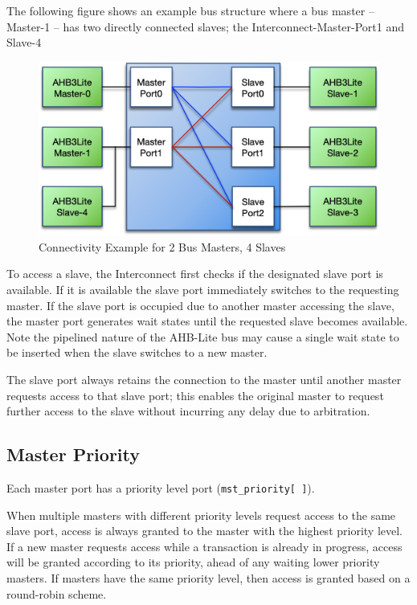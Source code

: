 The following figure shows an example bus structure where a bus master -- Master-1
-- has two directly connected slaves; the Interconnect-Master-Port1 and
Slave-4

\begin{figure}[tbh]
	\centering
	\includegraphics{assets/img/ahb-lite-switch-sys2}
	\caption{Connectivity Example for 2 Bus Masters, 4 Slaves}
	\label{fig:ahb-lite-switch-sys2}
\end{figure}

To access a slave, the Interconnect first checks if the designated slave
port is available. If it is available the slave port immediately
switches to the requesting master. If the slave port is occupied due to
another master accessing the slave, the master port generates wait
states until the requested slave becomes available. Note the pipelined
nature of the AHB-Lite bus may cause a single wait state to be inserted
when the slave switches to a new master.

The slave port always retains the connection to the master until another
master requests access to that slave port; this enables the original
master to request further access to the slave without incurring any
delay due to arbitration.

\subsection{Master Priority}\label{master-priority}

Each master port has a priority level port (\texttt{mst\_priority[\,]}).

When multiple masters with different priority levels request access to
the same slave port, access is always granted to the master with the
highest priority level. If a new master requests access while a
transaction is already in progress, access will be granted according to
its priority, ahead of any waiting lower priority masters. If masters
have the same priority level, then access is granted based on a
round-robin scheme.

